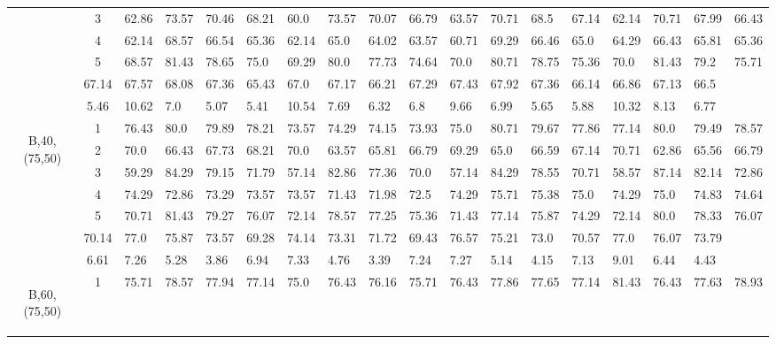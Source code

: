 \begin{table}[h]
{\begin{tabular}{cc|llll|llll|llll|llll}
 & 3 & 62.86 & 73.57 & 70.46 & 68.21 & 60.0 & 73.57 & 70.07 & 66.79 & 63.57 & 70.71 & 68.5 & 67.14 & 62.14 & 70.71 & 67.99 & 66.43 \\
 & 4 & 62.14 & 68.57 & 66.54 & 65.36 & 62.14 & 65.0 & 64.02 & 63.57 & 60.71 & 69.29 & 66.46 & 65.0 & 64.29 & 66.43 & 65.81 & 65.36 \\
 & 5 & 68.57 & 81.43 & 78.65 & 75.0 & 69.29 & 80.0 & 77.73 & 74.64 & 70.0 & 80.71 & 78.75 & 75.36 & 70.0 & 81.43 & 79.2 & 75.71 \\
\rowcolor{lightgray!50}\multicolumn{2}{r|}{avg} & 67.14 & 67.57 & 68.08 & 67.36 & 65.43 & 67.0 & 67.17 & 66.21 & 67.29 & 67.43 & 67.92 & 67.36 & 66.14 & 66.86 & 67.13 & 66.5 \\
\rowcolor{lightgray!50}\multicolumn{2}{r|}{std} & 5.46 & 10.62 & 7.0 & 5.07 & 5.41 & 10.54 & 7.69 & 6.32 & 6.8 & 9.66 & 6.99 & 5.65 & 5.88 & 10.32 & 8.13 & 6.77 \\
\multirow{5}{*}{\begin{sideways}B,40,(75,50)\end{sideways}} & 1 & 76.43 & 80.0 & 79.89 & 78.21 & 73.57 & 74.29 & 74.15 & 73.93 & 75.0 & 80.71 & 79.67 & 77.86 & 77.14 & 80.0 & 79.49 & 78.57 \\
 & 2 & 70.0 & 66.43 & 67.73 & 68.21 & 70.0 & 63.57 & 65.81 & 66.79 & 69.29 & 65.0 & 66.59 & 67.14 & 70.71 & 62.86 & 65.56 & 66.79 \\
 & 3 & 59.29 & 84.29 & 79.15 & 71.79 & 57.14 & 82.86 & 77.36 & 70.0 & 57.14 & 84.29 & 78.55 & 70.71 & 58.57 & 87.14 & 82.14 & 72.86 \\
 & 4 & 74.29 & 72.86 & 73.29 & 73.57 & 73.57 & 71.43 & 71.98 & 72.5 & 74.29 & 75.71 & 75.38 & 75.0 & 74.29 & 75.0 & 74.83 & 74.64 \\
 & 5 & 70.71 & 81.43 & 79.27 & 76.07 & 72.14 & 78.57 & 77.25 & 75.36 & 71.43 & 77.14 & 75.87 & 74.29 & 72.14 & 80.0 & 78.33 & 76.07 \\
\rowcolor{lightgray!50}\multicolumn{2}{r|}{avg} & 70.14 & 77.0 & 75.87 & 73.57 & 69.28 & 74.14 & 73.31 & 71.72 & 69.43 & 76.57 & 75.21 & 73.0 & 70.57 & 77.0 & 76.07 & 73.79 \\
\rowcolor{lightgray!50}\multicolumn{2}{r|}{std} & 6.61 & 7.26 & 5.28 & 3.86 & 6.94 & 7.33 & 4.76 & 3.39 & 7.24 & 7.27 & 5.14 & 4.15 & 7.13 & 9.01 & 6.44 & 4.43 \\
\multirow{5}{*}{\begin{sideways}B,60,(75,50)\end{sideways}} & 1 & 75.71 & 78.57 & 77.94 & 77.14 & 75.0 & 76.43 & 76.16 & 75.71 & 76.43 & 77.86 & 77.65 & 77.14 & 81.43 & 76.43 & 77.63 & 78.93 \\

\end{tabular}}
\end{table}
